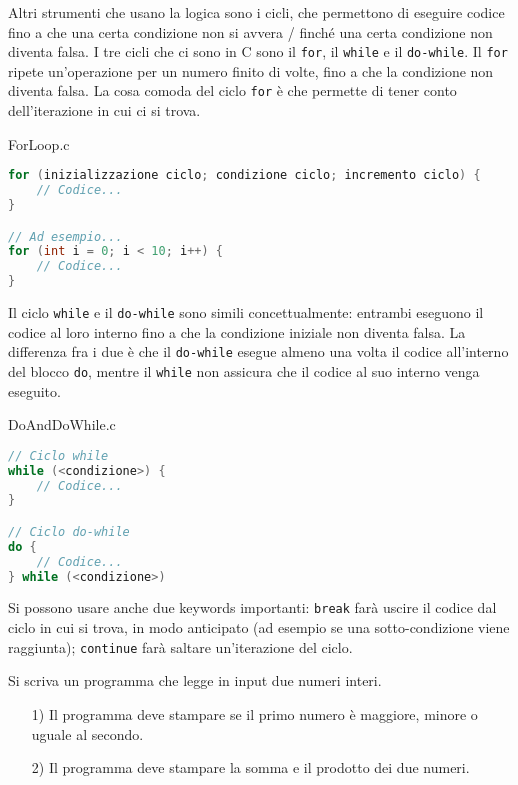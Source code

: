 Altri strumenti che usano la logica sono i cicli, che permettono di eseguire codice fino a che una certa condizione non si avvera / finché una certa condizione non diventa falsa. I tre cicli che ci sono in C sono il \verb|for|, il \verb|while| e il \verb|do-while|.
\nl
Il \verb|for| ripete un'operazione per un numero finito di volte, fino a che la condizione non diventa falsa. La cosa comoda del ciclo \verb|for| è che permette di tener conto dell'iterazione in cui ci si trova.

\begin{codeblock}{ForLoop.c}
    \begin{lstlisting}[language = c]
for (inizializzazione ciclo; condizione ciclo; incremento ciclo) {
    // Codice...
}

// Ad esempio...
for (int i = 0; i < 10; i++) {
    // Codice...
}\end{lstlisting}
\end{codeblock}

Il ciclo \verb|while| e il \verb|do-while| sono simili concettualmente: entrambi eseguono il codice al loro interno fino a che la condizione iniziale non diventa falsa. La differenza fra i due è che il \verb|do-while| esegue almeno una volta il codice all'interno del blocco \verb|do|, mentre il \verb|while| non assicura che il codice al suo interno venga eseguito.

\begin{codeblock}{DoAndDoWhile.c}
    \begin{lstlisting}[language = c]
// Ciclo while
while (<condizione>) {
    // Codice...
}

// Ciclo do-while
do {
    // Codice...
} while (<condizione>)\end{lstlisting}
\end{codeblock}

Si possono usare anche due keywords importanti: \verb|break| farà uscire il codice dal ciclo in cui si trova, in modo anticipato (ad esempio se una sotto-condizione viene raggiunta); \verb|continue| farà saltare un'iterazione del ciclo.

\begin{exercise}
    Si scriva un programma che legge in input due numeri interi.
    \begin{itemize}
        \item [1)] Il programma deve stampare se il primo numero è maggiore, minore o uguale al secondo.
        \item [2)] Il programma deve stampare la somma e il prodotto dei due numeri.
    \end{itemize}
\end{exercise}

